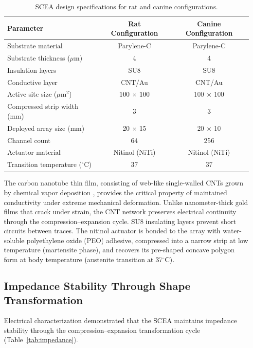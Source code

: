 \documentclass[11pt]{article}
\begin{document}
\begin{table}[H]
\centering
\caption{SCEA design specifications for rat and canine configurations.}
\label{tab:design}
\begin{tabular}{lcc}
\toprule
Parameter & Rat Configuration & Canine Configuration \\
\midrule
Substrate material & Parylene-C & Parylene-C \\
Substrate thickness ($\mu$m) & 4 & 4 \\
Insulation layers & SU8 & SU8 \\
Conductive layer & CNT/Au & CNT/Au \\
Active site size ($\mu$m$^2$) & 100 $\times$ 100 & 100 $\times$ 100 \\
Compressed strip width (mm) & 3 & 3 \\
Deployed array size (mm) & 20 $\times$ 15 & 20 $\times$ 10 \\
Channel count & 64 & 256 \\
Actuator material & Nitinol (NiTi) & Nitinol (NiTi) \\
Transition temperature ($^{\circ}$C) & 37 & 37 \\
\bottomrule
\end{tabular}
\end{table}

The carbon nanotube thin film, consisting of web-like single-walled CNTs grown by chemical vapor deposition \citep{cvd_cnt2009}, provides the critical property of maintained conductivity under extreme mechanical deformation. Unlike nanometer-thick gold films that crack under strain, the CNT network preserves electrical continuity through the compression--expansion cycle. SU8 insulating layers \citep{su8_insulation2012} prevent short circuits between traces. The nitinol actuator is bonded to the array with water-soluble polyethylene oxide (PEO) adhesive, compressed into a narrow strip at low temperature (martensite phase), and recovers its pre-shaped concave polygon form at body temperature (austenite transition at 37$^{\circ}$C).

\subsection{Impedance Stability Through Shape Transformation}

Electrical characterization demonstrated that the SCEA maintains impedance stability through the compression--expansion transformation cycle (Table~\ref{tab:impedance}).
\end{document}
